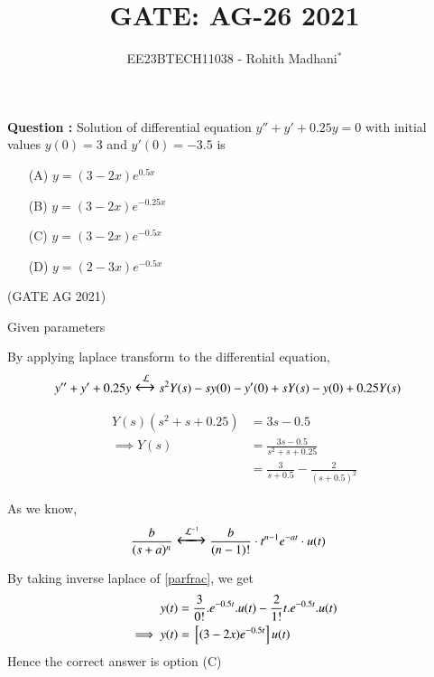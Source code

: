 \documentclass[journal,12pt,twocolumn]{IEEEtran}
\theoremstyle{remark}
\begin{document}

\vspace{3cm}

\title{GATE: AG-26 2021}
\author{EE23BTECH11038 - Rohith Madhani$^{*}$%
}
\maketitle
\newpage
\bigskip
\renewcommand{\thefigure}{\theenumi}
\renewcommand{\thetable}{\theenumi}

\textbf{Question :} Solution of differential equation $y'' + y'+ 0.25y = 0$ with initial values $y(0) = 3$ and $y'(0) = -3.5$ is
\begin{enumerate}
    \item[(A)] $ y = (3-2x)e^{0.5x} $
    \item[(B)] $ y = (3-2x)e^{-0.25x}$
    \item[(C)] $ y = (3-2x)e^{-0.5x}$
    \item[(D)] $ y = (2-3x)e^{-0.5x}$
\end{enumerate} 
\hfill(GATE AG 2021) \\
\solution

\begin{table}[!h] 
    \centering
    
    \caption{Given parameters}
    \label{table:gate21ag26}
\end{table}
By applying laplace transform to the differential equation,
\begin{align}
    y''+y'+0.25y &\Large\xleftrightarrow{\mathcal{L}} s^2Y(s)-sy(0)-y'(0)+sY(s)-y(0)+0.25Y(s)
\end{align}

\begin{align}
    Y(s)(s^2 + s + 0.25) &= 3s - 0.5 \\
    \implies Y(s) &= \frac{3s-0.5}{s^2 + s + 0.25} \\
    &= \frac{3}{s+0.5} - \frac{2}{(s+0.5)^2} \label{parfrac}
\end{align}

As we know,
\begin{align}
    \frac{b}{(s+a)^n} &\Large\xleftrightarrow{\mathcal{L}^{-1}}\frac{b}{(n-1)!}\cdot t^{n-1} e^{-at}\cdot u(t)
\end{align}

By taking inverse laplace of \eqref{parfrac}, we get
\begin{align}
    y(t) &= \frac{3}{0!}.e^{-0.5t}.u(t)-\frac{2}{1!}t.e^{-0.5t}.u(t) \\
    \implies y(t) &= {}\left[(3-2x)e^{-0.5t}\right]u(t)
\end{align}
Hence the correct answer is option (C)
\newpage
\end{document}
